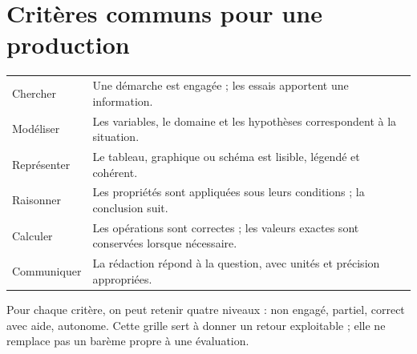 \section*{Critères communs pour une production}
\begin{center}\small\renewcommand{\arraystretch}{1.6}\begin{tabularx}{\linewidth}{l X}
Chercher&Une démarche est engagée ; les essais apportent une information.\\
Modéliser&Les variables, le domaine et les hypothèses correspondent à la situation.\\
Représenter&Le tableau, graphique ou schéma est lisible, légendé et cohérent.\\
Raisonner&Les propriétés sont appliquées sous leurs conditions ; la conclusion suit.\\
Calculer&Les opérations sont correctes ; les valeurs exactes sont conservées lorsque nécessaire.\\
Communiquer&La rédaction répond à la question, avec unités et précision appropriées.
\end{tabularx}\end{center}
Pour chaque critère, on peut retenir quatre niveaux : non engagé, partiel, correct avec aide, autonome. Cette grille sert à donner un retour exploitable ; elle ne remplace pas un barème propre à une évaluation.

